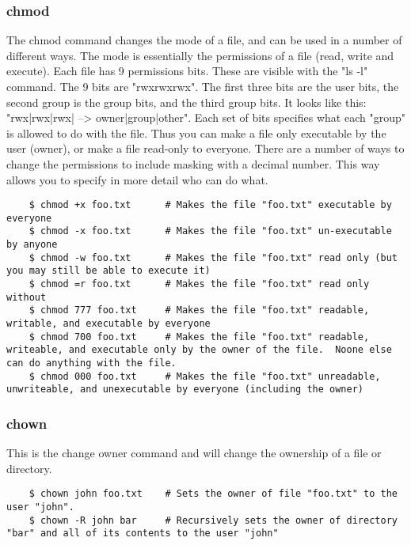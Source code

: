 \subsubsection{chmod} \mdseries
The chmod command changes the mode of a file, and can be used in a number of different ways.  The mode is essentially the permissions of a file (read, write and execute).  Each file has 9 permissions bits.  These are visible with the "ls -l" command.  The 9 bits are "rwxrwxrwx".  The first three bits are the user bits, the second group is the group bits, and the third group bits.  It looks like this: "rwx|rwx|rwx| --> owner|group|other".  Each set of bits specifies what each "group" is allowed to do with the file.  Thus you can make a file only executable by the user (owner), or make a file read-only to everyone.  There are a number of ways to change the permissions to include masking with a decimal number.  This way allows you to specify in more detail who can do what.

	\begin{lstlisting}
	$ chmod +x foo.txt		# Makes the file "foo.txt" executable by everyone
	$ chmod -x foo.txt		# Makes the file "foo.txt" un-executable by anyone
	$ chmod -w foo.txt		# Makes the file "foo.txt" read only (but you may still be able to execute it)
	$ chmod =r foo.txt		# Makes the file "foo.txt" read only without 
	$ chmod 777 foo.txt		# Makes the file "foo.txt" readable, writable, and executable by everyone
	$ chmod 700 foo.txt		# Makes the file "foo.txt" readable, writeable, and executable only by the owner of the file.  Noone else can do anything with the file.
	$ chmod 000 foo.txt		# Makes the file "foo.txt" unreadable, unwriteable, and unexecutable by everyone (including the owner)
	\end{lstlisting}
	
\subsubsection{chown} \mdseries
This is the change owner command and will change the ownership of a file or directory.  

	\begin{lstlisting}
	$ chown john foo.txt	# Sets the owner of file "foo.txt" to the user "john".
	$ chown -R john bar		# Recursively sets the owner of directory "bar" and all of its contents to the user "john"
	\end{lstlisting}

